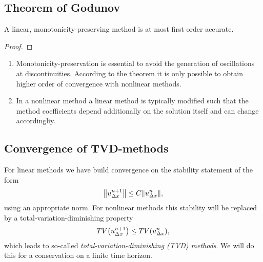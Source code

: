 \subsection{Theorem of Godunov}

\begin{theorem}[Godunov]
	A linear, monotonicity-preserving method is at most first order accurate.
\end{theorem}

\begin{proof}
	
\end{proof}

\begin{remark}
	\begin{enumerate}
		\item Monotonicity-preservation is essential to avoid the generation of oscillations at discontinuities.
		According to the theorem it is only possible to obtain higher order of convergence with nonlinear methods.
		\item In a nonlinear method a linear method is typically modified such that the method coefficients depend additionally on the solution itself and can change accordingliy.
	\end{enumerate}
\end{remark}

\begin{example}
	
\end{example}


\subsection{Convergence of TVD-methods}

For linear methods we have build convergence on the stability statement of the form
\[
	\norm*{u_{\Delta x}^{n + 1}} \le C\norm*{u_{\Delta x}^n},
\]
using an appropriate norm.
For nonlinear methods this stability will be replaced by a total-variation-diminishing property
\[
	TV\parentheses*{u_{\Delta x}^{n + 1}} \le TV\parentheses*{u_{\Delta x}^n},
\]
which leads to so-called \emph{total-variation-diminishing (TVD) methods}.
We will do this for a conservation on a finite time horizon.

